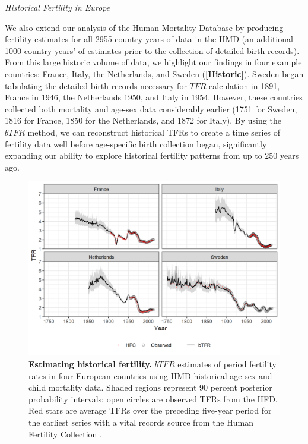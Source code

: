 \documentclass[12pt]{article}
\begin{document}
\emph{Historical Fertility in Europe}

We also extend our analysis of the Human Mortality Database by producing
fertility estimates for all 2955 country-years of data in the HMD (an
additional 1000 country-years' of estimates prior to the collection of
detailed birth records). From this large historic volume of data, we
highlight our findings in four example countries: France, Italy, the
Netherlands, and Sweden (\textbf{\autoref{Historic}}). Sweden began
tabulating the detailed birth records necessary for \(TFR\) calculation
in 1891, France in 1946, the Netherlands 1950, and Italy in 1954.
However, these countries collected both mortality and age-sex data
considerably earlier (1751 for Sweden, 1816 for France, 1850 for the
Netherlands, and 1872 for Italy). By using the \(bTFR\) method, we can
reconstruct historical TFRs to create a time series of fertility data
well before age-specific birth collection began, significantly expanding
our ability to explore historical fertility patterns from up to 250
years ago.

\begin{figure}
\centering
\includegraphics{manuscript_files/figure-latex/plot-historical-hmd-estimates-1.png}
\caption{\textbf{Estimating historical fertility.} \(bTFR\) estimates of
period fertility rates in four European countries using HMD historical
age-sex and child mortality data. Shaded regions represent 90 percent
posterior probability intervals; open circles are observed TFRs from the
HFD. Red stars are average TFRs over the preceding five-year period for
the earliest series with a vital records source from the Human Fertility
Collection \citep{HFC}.\label{Historic}}
\end{figure}
\end{document}
